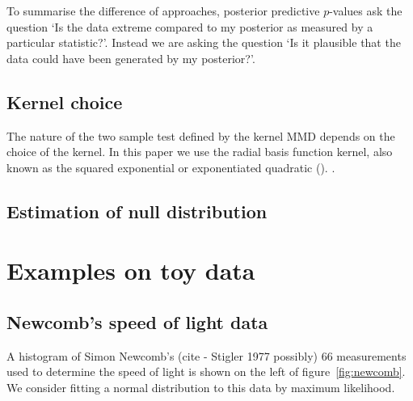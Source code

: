 \documentclass{article} %
\begin{document}
To summarise the difference of approaches, posterior predictive $p$-values ask the question `Is the data extreme compared to my posterior as measured by a particular statistic?'.
Instead we are asking the question `Is it plausible that the data could have been generated by my posterior?'.

\subsection{Kernel choice}

The nature of the two sample test defined by the kernel MMD depends on the choice of the kernel.
In this paper we use the radial basis function kernel, also known as the squared exponential or exponentiated quadratic ().
.


\subsection{Estimation of null distribution}


\section{Examples on toy data}

\subsection{Newcomb's speed of light data}


A histogram of Simon Newcomb's (cite - Stigler 1977 possibly) 66 measurements used to determine the speed of light is shown on the left of figure~\ref{fig:newcomb}.
We consider fitting a normal distribution to this data by maximum likelihood\footnotemark.
\end{document}
